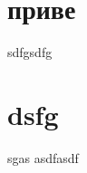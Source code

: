 \documentclass{report}
\begin{document}
\tableofcontents


\section[s]{приве}
sdfgsdfg
\section{dsfg}
sgas
asdfasdf
\end{document}
